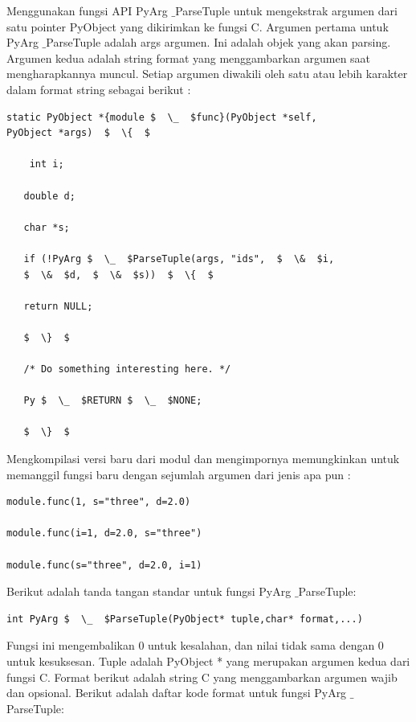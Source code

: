\vspace{12pt}
Menggunakan fungsi API PyArg $  \_  $ParseTuple untuk mengekstrak argumen dari satu pointer PyObject yang dikirimkan ke fungsi C. Argumen pertama untuk PyArg $  \_  $ParseTuple adalah args argumen. Ini adalah objek yang akan parsing. Argumen kedua adalah string format yang menggambarkan argumen saat mengharapkannya muncul. Setiap argumen diwakili oleh satu atau lebih karakter dalam format string sebagai berikut : 

\begin{verbatim}
static PyObject *{module $  \_  $func}(PyObject *self, 
PyObject *args)  $  \{  $ 

    int i;

   double d; 

   char *s; 
   
   if (!PyArg $  \_  $ParseTuple(args, "ids",  $  \&  $i,
   $  \&  $d,  $  \&  $s))  $  \{  $ 

   return NULL; 

   $  \}  $ 

   /* Do something interesting here. */ 

   Py $  \_  $RETURN $  \_  $NONE; 

   $  \}  $ 
\end{verbatim}

\vspace{12pt}
Mengkompilasi versi baru dari modul dan mengimpornya memungkinkan untuk memanggil fungsi baru dengan sejumlah argumen dari jenis apa pun : 
\begin{verbatim}
module.func(1, s="three", d=2.0) 

module.func(i=1, d=2.0, s="three") 

module.func(s="three", d=2.0, i=1) 

\end{verbatim}
\vspace{12pt}
\hspace*{0.5in} Berikut adalah tanda tangan standar untuk 
fungsi PyArg $  \_  $ParseTuple: 
 
\begin{verbatim}
int PyArg $  \_  $ParseTuple(PyObject* tuple,char* format,...) 
\end{verbatim}

\vspace{10pt}
\hspace*{0.5in} Fungsi ini mengembalikan 0 untuk kesalahan, dan nilai tidak sama dengan 0 untuk kesuksesan. Tuple adalah PyObject * yang merupakan argumen kedua dari fungsi C. Format berikut adalah string C yang menggambarkan argumen wajib dan opsional. Berikut adalah daftar kode format untuk fungsi PyArg $  \_  $ParseTuple: 

